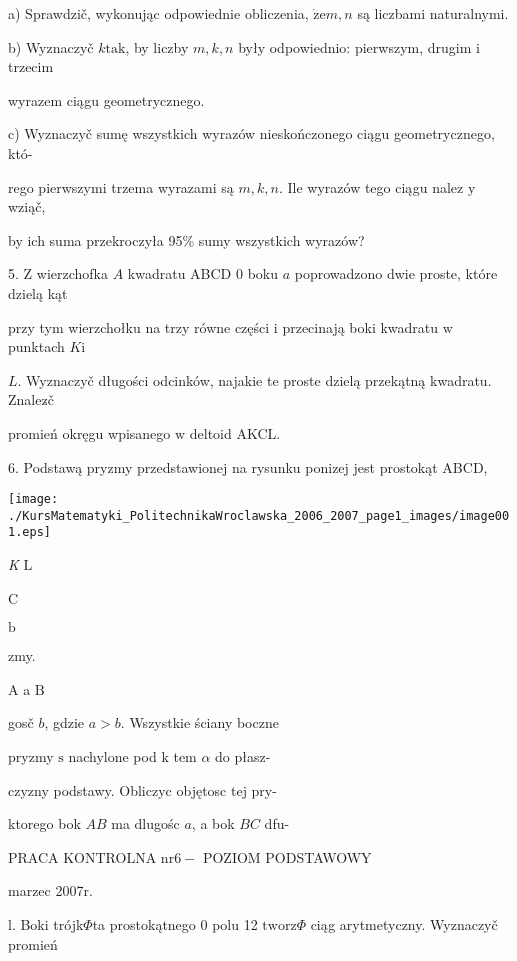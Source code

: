 \documentclass[a4paper,12pt]{article}
\begin{document}
a) Sprawdzič, wykonując odpowiednie obliczenia, $\dot{\mathrm{z}}\mathrm{e}m, n$ są liczbami naturalnymi.

b) Wyznaczyč $k\mathrm{t}\mathrm{a}\mathrm{k}$, by liczby $m, k, n$ były odpowiednio: pierwszym, drugim $\mathrm{i}$ trzecim

wyrazem ciągu geometrycznego.

c) Wyznaczyč sumę wszystkich wyrazów nieskończonego ciągu geometrycznego, któ-

rego pierwszymi trzema wyrazami są $m, k, n$. Ile wyrazów tego ciągu nalez $\mathrm{y}$ wziąč,

by ich suma przekroczyła 95\% sumy wszystkich wyrazów?

5. $\mathrm{Z}$ wierzchofka $A$ kwadratu ABCD $0$ boku $a$ poprowadzono dwie proste, które dzielą kąt

przy tym wierzchołku na trzy równe części $\mathrm{i}$ przecinają boki kwadratu $\mathrm{w}$ punktach $K\mathrm{i}$

$L$. Wyznaczyč długości odcinków, najakie te proste dzielą przekątną kwadratu. Znalez$\acute{}$č

promień okręgu wpisanego $\mathrm{w}$ deltoid AKCL.

6. Podstawą pryzmy przedstawionej na rysunku ponizej jest prostokąt ABCD,
\begin{center}
\texttt{[image: ./KursMatematyki\_PolitechnikaWroclawska\_2006\_2007\_page1\_images/image001.eps]}
\end{center}
{\it K} $\mathrm{L}$

C

$\mathrm{b}$

zmy.

A a $\mathrm{B}$

gosč $b$, gdzie $a>b$. Wszystkie ściany boczne

pryzmy $\mathrm{s}$ nachylone pod $\mathrm{k}$ tem $\alpha$ do płasz-

czyzny podstawy. Obliczyc objętosc tej pry-

ktorego bok $AB$ ma dlugośc $a$, a bok $BC$ dfu-





PRACA KONTROLNA $\mathrm{n}\mathrm{r}6-$ POZIOM PODSTAWOWY

marzec 2007r.

l. Boki trójk$\Phi$ta prostokątnego $0$ polu 12 $\mathrm{t}\mathrm{w}\mathrm{o}\mathrm{r}\mathrm{z}\Phi$ ciąg arytmetyczny. Wyznaczyč promień
\end{document}
